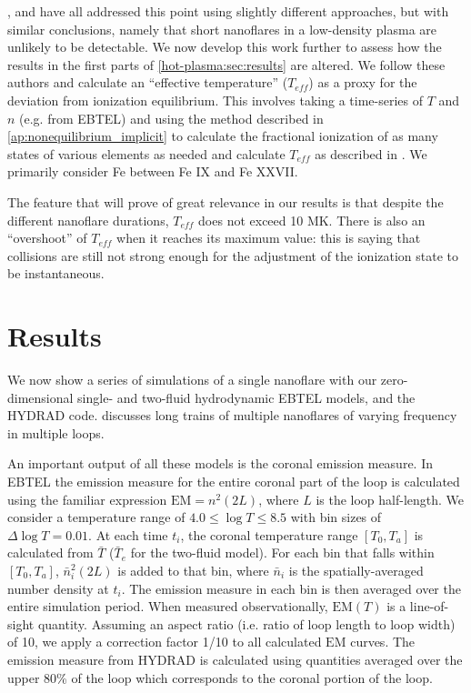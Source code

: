 \citet{bradshaw_explosive_2006}, \citet{reale_nonequilibrium_2008} and \citet{bradshaw_numerical_2009} have all addressed this point using slightly different approaches, but with similar conclusions, namely that short nanoflares in a low-density plasma are unlikely to be detectable. We now develop this work further to assess how the results in the first parts of \autoref{hot-plasma:sec:results} are altered. We follow these authors and calculate an ``effective temperature'' ($T_{eff}$) as a proxy for the deviation from ionization equilibrium. This involves taking a time-series of $T$ and $n$ (e.g. from EBTEL) and using the method described in \autoref{ap:nonequilibrium_implicit} to calculate the fractional ionization of as many states of various elements as needed and calculate $T_{eff}$ as described in \citet{bradshaw_numerical_2009}. We primarily consider Fe between Fe IX and Fe XXVII.

The feature that will prove of great relevance in our results is that despite the different nanoflare durations, $T_{eff}$ does not exceed 10 MK. There is also an ``overshoot'' of $T_{eff}$ when it reaches its maximum value: this is saying that collisions are still not strong enough for the adjustment of the ionization state to be instantaneous.

\section{Results}\label{hot-plasma:sec:results}

We now show a series of simulations of a single nanoflare with our zero-dimensional single- and two-fluid hydrodynamic EBTEL models, and the HYDRAD code.  discusses long trains of multiple nanoflares of varying frequency in multiple loops.

An important output of all these models is the coronal emission measure. In EBTEL the emission measure for the entire coronal part of the loop is calculated using the familiar expression $\mathrm{EM}=n^2(2L)$, where $L$ is the loop half-length. We consider a temperature range of $4.0\le\log{T}\le8.5$ with bin sizes of $\Delta\log{T}=0.01$. At each time $t_i$, the coronal temperature range $[T_0,T_a]$ is calculated from $\bar{T}$ ($\bar{T}_e$ for the two-fluid model). For each bin that falls within $[T_0,T_a]$, $\bar{n}_i^2(2L)$ is added to that bin, where $\bar{n}_i$ is the spatially-averaged number density at $t_i$. The emission measure in each bin is then averaged over the entire simulation period. When measured observationally, $\mathrm{EM}(T)$ is a line-of-sight quantity. Assuming an aspect ratio (i.e. ratio of loop length to loop width) of 10, we apply a correction factor 1/10 to all calculated $\mathrm{EM}$ curves. The emission measure from HYDRAD is calculated using quantities averaged over the upper 80\% of the loop which corresponds to the coronal portion of the loop.

